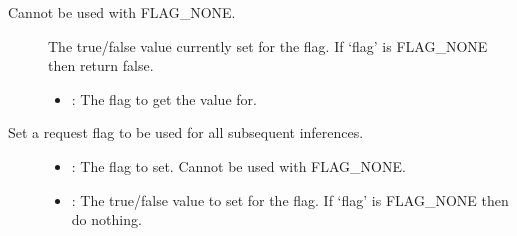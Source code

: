 \documentclass[letterpaper,10pt,english]{sphinxmanual}
\begin{document}
\begin{fulllineitems}
\begin{fulllineitems}
Cannot be used with FLAG\_NONE. \begin{description}
\item[{}] \leavevmode
The true/false value currently set for the flag. If ‘flag’ is FLAG\_NONE then return false. 

\item[{}] \leavevmode\begin{itemize}
\item {} 
: The flag to get the value for. 

\end{itemize}

\end{description}


\end{fulllineitems}


\begin{fulllineitems}
\label{\detokenize{cpp_api/classnvidia_1_1inferenceserver_1_1client_1_1InferContext_1_1Options:_CPPv4N6nvidia15inferenceserver6client12InferContext7Options7SetFlagEN18InferRequestHeader4FlagEb}}%
\pysigstartmultiline
{}\label{\detokenize{cpp_api/classnvidia_1_1inferenceserver_1_1client_1_1InferContext_1_1Options:classnvidia_1_1inferenceserver_1_1client_1_1InferContext_1_1Options_1ae12fc02abb1e1f42d1de0e0d4f88c03d}}%
\pysigstopmultiline
Set a request flag to be used for all subsequent inferences. 

\begin{description}
\item[{}] \leavevmode\begin{itemize}
\item {} 
: The flag to set. Cannot be used with FLAG\_NONE. 

\item {} 
: The true/false value to set for the flag. If ‘flag’ is FLAG\_NONE then do nothing. 

\end{itemize}


\end{description}
\end{fulllineitems}
\end{fulllineitems}
\end{document}
